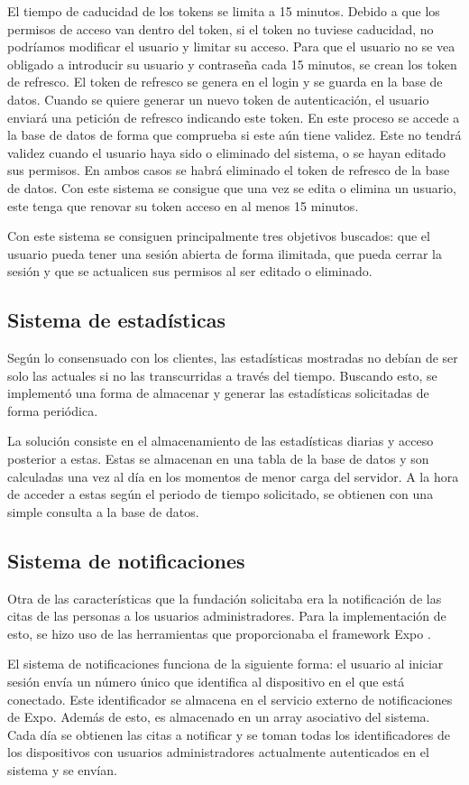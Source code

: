 El tiempo de caducidad de los tokens se limita a 15 minutos. Debido a que los permisos de acceso van dentro del token, si el token no tuviese caducidad, no podríamos modificar el usuario y limitar su acceso. Para que el usuario no se vea obligado a introducir su usuario y contraseña cada 15 minutos, se crean los token de refresco. El token de refresco se genera en el login y se guarda en la base de datos. Cuando se quiere generar un nuevo token de autenticación, el usuario enviará una petición de refresco indicando este token. En este proceso se accede a la base de datos de forma que comprueba si este aún tiene validez. Este no tendrá validez cuando el usuario haya sido o eliminado del sistema, o se hayan editado sus permisos. En ambos casos se habrá eliminado el token de refresco de la base de datos. Con este sistema se consigue que una vez se edita o elimina un usuario, este tenga que renovar su token acceso en al menos 15 minutos. 

Con este sistema se consiguen principalmente tres objetivos buscados: que el usuario pueda tener una sesión abierta de forma ilimitada, que pueda cerrar la sesión y que se actualicen sus permisos al ser editado o eliminado.

\subsection{Sistema de estadísticas}

Según lo consensuado con los clientes, las estadísticas mostradas no debían de ser solo las actuales si no las transcurridas a través del tiempo. Buscando esto, se implementó una forma de almacenar y generar las estadísticas solicitadas de forma periódica. 

La solución consiste en el almacenamiento de las estadísticas diarias y acceso posterior a estas. Estas se almacenan en una tabla de la base de datos y son calculadas una vez al día en los momentos de menor carga del servidor. A la hora de acceder a estas según el periodo de tiempo solicitado, se obtienen con una simple consulta a la base de datos. 

\subsection{Sistema de notificaciones}

Otra de las características que la fundación solicitaba era la notificación de las citas de las personas a los usuarios administradores. Para la implementación de esto, se hizo uso de las herramientas que proporcionaba el framework Expo \cite{expo-notifications}. 

El sistema de notificaciones funciona de la siguiente forma: el usuario al iniciar sesión envía un número único que identifica al dispositivo en el que está conectado. Este identificador se almacena en el servicio externo de notificaciones de Expo. Además de esto, es almacenado en un array asociativo del sistema. Cada día se obtienen las citas a notificar y se toman todas los identificadores de los dispositivos con usuarios administradores actualmente autenticados en el sistema y se envían. 
